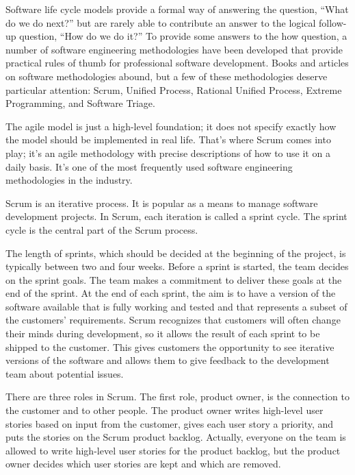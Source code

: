
Software life cycle models provide a formal way of answering the question, “What do we do next?” but are rarely able to contribute an answer to the logical follow-up question, “How do we do it?” To provide some answers to the how question, a number of software engineering methodologies have been developed that provide practical rules of thumb for professional software development. Books and articles on software methodologies abound, but a few of these methodologies deserve particular attention: Scrum, Unified Process, Rational Unified Process, Extreme Programming, and Software Triage.


The agile model is just a high-level foundation; it does not specify exactly how the model should be implemented in real life. That’s where Scrum comes into play; it’s an agile methodology with precise descriptions of how to use it on a daily basis. It’s one of the most frequently used software engineering methodologies in the industry.

Scrum is an iterative process. It is popular as a means to manage software development projects. In Scrum, each iteration is called a sprint cycle. The sprint cycle is the central part of the Scrum process.

The length of sprints, which should be decided at the beginning of the project, is typically between two and four weeks. Before a sprint is started, the team decides on the sprint goals. The team makes a commitment to deliver these goals at the end of the sprint. At the end of each sprint, the aim is to have a version of the software available that is fully working and tested and that represents a subset of the customers’ requirements. Scrum recognizes that customers will often change their minds during development, so it allows the result of each sprint to be shipped to the customer. This gives customers the opportunity to see iterative versions of the software and allows them to give feedback to the development team about potential issues.


There are three roles in Scrum. The first role, product owner, is the connection to the customer and to other people. The product owner writes high-level user stories based on input from the customer, gives each user story a priority, and puts the stories on the Scrum product backlog. Actually, everyone on the team is allowed to write high-level user stories for the product backlog, but the product owner decides which user stories are kept and which are removed.

